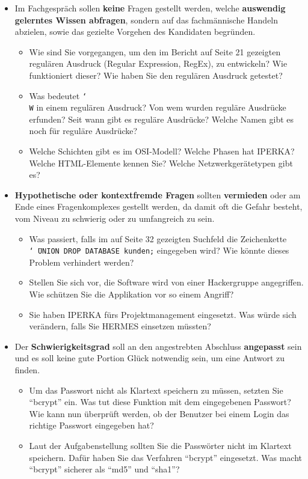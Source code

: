 \begin{itemize}
  \item Im Fachgespräch sollen \textbf{keine} Fragen gestellt werden, welche \textbf{auswendig gelerntes Wissen abfragen}, sondern auf das fachmännische Handeln abzielen, sowie das gezielte Vorgehen des Kandidaten begründen.
  \begin{itemize}
    \item[\ding{51}] Wie sind Sie vorgegangen, um den im Bericht auf Seite 21 gezeigten regulären Ausdruck (Regular Expression, RegEx), zu entwickeln? Wie funktioniert dieser? Wie haben Sie den regulären Ausdruck getestet?
    \item[\ding{55}] Was bedeutet \texttt{\char`\\W} in einem regulären Ausdruck? Von wem wurden reguläre Ausdrücke erfunden? Seit wann gibt es reguläre Ausdrücke? Welche Namen gibt es noch für reguläre Ausdrücke?
    \item[\ding{55}] Welche Schichten gibt es im OSI-Modell? Welche Phasen hat IPERKA? Welche HTML-Elemente kennen Sie? Welche Netzwerkgerätetypen gibt es?
  \end{itemize}
  \item \textbf{Hypothetische oder kontextfremde Fragen} sollten \textbf{vermieden} oder am Ende eines Fragenkomplexes gestellt werden, da damit oft die Gefahr besteht, vom Niveau zu schwierig oder zu umfangreich zu sein.
  \begin{itemize}
    \item[\ding{51}] Was passiert, falls im auf Seite 32 gezeigten Suchfeld die Zeichenkette \texttt{\char`\"\ UNION DROP DATABASE kunden;} eingegeben wird? Wie könnte dieses Problem verhindert werden?
    \item[\ding{55}] Stellen Sie sich vor, die Software wird von einer Hackergruppe angegriffen. Wie schützen Sie die Applikation vor so einem Angriff?
    \item[\ding{55}] Sie haben IPERKA fürs Projektmanagement eingesetzt. Was würde sich verändern, falls Sie HERMES einsetzen müssten?
  \end{itemize}
  \item Der \textbf{Schwierigkeitsgrad} soll an den angestrebten Abschluss \textbf{angepasst} sein und es soll keine gute Portion Glück notwendig sein, um eine Antwort zu finden.
  \begin{itemize}
    \item[\ding{51}] Um das Passwort nicht als Klartext speichern zu müssen, setzten Sie \enquote{bcrypt} ein. Was tut diese Funktion mit dem eingegebenen Passwort? Wie kann nun überprüft werden, ob der Benutzer bei einem Login das richtige Passwort eingegeben hat?
    \item[\ding{55}] Laut der Aufgabenstellung sollten Sie die Passwörter nicht im Klartext speichern. Dafür haben Sie das Verfahren \enquote{bcrypt} eingesetzt. Was macht \enquote{bcrypt} sicherer als \enquote{md5} und \enquote{sha1}?
  \end{itemize}
\end{itemize}
